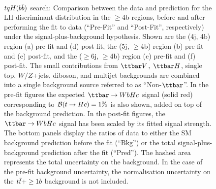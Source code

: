 \begin{figure}[htbp]
\begin{center}
 \\
\caption{\small{$tqH(b\bar{b})$ search: Comparison between the data and prediction for the LH discriminant distribution in the $\geq$4b regions,
before and after performing the fit to data  (``Pre-Fit'' and ``Post-Fit'', respectively) under the signal-plus-background hypothesis.
Shown are the (4j, 4b) region (a) pre-fit and (d) post-fit,  the (5j, $\geq$4b) region (b) pre-fit and (e) post-fit, and
the ($\geq$6j, $\geq$4b) region (c) pre-fit and (f) post-fit.
The small contributions from $\ttbar V$, $\ttbar H$, single top, $W/Z$+jets, diboson, and multijet backgrounds are combined into a single background source 
referred to as ``Non-$\ttbar$''. 
In the pre-fit figures the expected $\Hc$ signal (solid red) corresponding to $\mathcal{B}(t\to Hc)=1\%$ is also shown,
added on top of the background prediction. In the post-fit figures, the $\Hc$ signal has been scaled by its fitted signal strength.
The bottom panels display the ratios of data to either the SM background prediction before the fit (``Bkg'')  or the total signal-plus-background
prediction after the fit (``Pred''). 
The hashed area represents the total uncertainty on the background.
In the case of the pre-fit background uncertainty, the normalisation uncertainty on the $t\bar{t}+\geq1b$ background is not included. }}
\label{fig:prepostfit_unblinded_WbHc_4btagin}
\end{center}
\end{figure}

